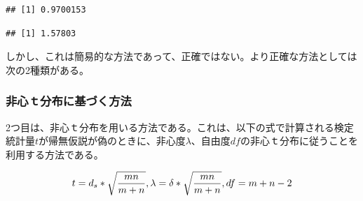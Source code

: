 \documentclass[
  ja=standard, xelatex, base=12pt]{bxjsreport}
\newenvironment{Shaded}{\begin{snugshade}}{\end{snugshade}}
\newcommand{\CommentTok}[1]{\textcolor[rgb]{0.56,0.35,0.01}{\textit{#1}}}
\newcommand{\DecValTok}[1]{\textcolor[rgb]{0.00,0.00,0.81}{#1}}
\newcommand{\FloatTok}[1]{\textcolor[rgb]{0.00,0.00,0.81}{#1}}
\newcommand{\FunctionTok}[1]{\textcolor[rgb]{0.00,0.00,0.00}{#1}}
\newcommand{\NormalTok}[1]{#1}
\newcommand{\OtherTok}[1]{\textcolor[rgb]{0.56,0.35,0.01}{#1}}
\newcommand{\SpecialCharTok}[1]{\textcolor[rgb]{0.00,0.00,0.00}{#1}}
\begin{document}
\begin{Shaded}
\end{Shaded}

\begin{verbatim}
## [1] 0.9700153
\end{verbatim}

\begin{Shaded}
\end{Shaded}

\begin{verbatim}
## [1] 1.57803
\end{verbatim}

しかし、これは簡易的な方法であって、正確ではない。より正確な方法としては次の2種類がある。

\hypertarget{ux975eux5fc3uxff54ux5206ux5e03ux306bux57faux3065ux304fux65b9ux6cd5}{%
\subsubsection{非心ｔ分布に基づく方法}\label{ux975eux5fc3uxff54ux5206ux5e03ux306bux57faux3065ux304fux65b9ux6cd5}}

2つ目は、非心ｔ分布を用いる方法である。これは、以下の式で計算される検定統計量\(t\)が帰無仮説が偽のときに、非心度\(λ\)、自由度\(df\)の非心ｔ分布に従うことを利用する方法である。

\[
t=d_s*\sqrt{\frac{mn}{m+n}},\\
\lambda=\delta*\sqrt{\frac{mn}{m+n}},\\
df=m+n-2
\]
\end{document}
